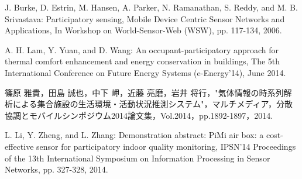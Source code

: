 \documentclass[submit,techrep]{ipsj}
\begin{document}
\begin{thebibliography}{10}
J. Burke, D. Estrin, M. Hansen, A. Parker, N. Ramanathan, S. Reddy, and M. B. Srivastava:
Participatory sensing, Mobile Device Centric Sensor Networks and Applications,
In Workshop on World-Sensor-Web (WSW),
pp. 117-134, 2006.



A. H. Lam, Y. Yuan, and D. Wang:
An occupant-participatory approach for thermal comfort enhancement and energy conservation in buildings, The 5th International Conference on Future Energy Systems (e-Energy'14), June 2014.




篠原 雅貴，田島 誠也，中下 岬，近藤 亮磨，岩井 将行，"気体情報の時系列解析による集合施設の生活環境・活動状況推測システム"，マルチメディア，分散協調とモバイルシンポジウム2014論文集，Vol.2014，pp.1892-1897，2014.

L. Li, Y. Zheng, and L. Zhang:
Demonstration abstract: PiMi air box: a cost-effective sensor for participatory indoor quality monitoring,
IPSN'14 Proceedings of the 13th International Symposium on Information Processing in Sensor Networks,
pp. 327-328, 2014.


\end{thebibliography}
\end{document}
